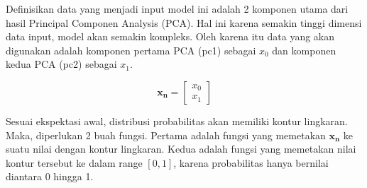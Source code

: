 Definisikan data yang menjadi input model ini adalah 2 komponen utama dari hasil Principal Componen Analysis (PCA). Hal ini karena semakin tinggi dimensi data input, model akan semakin kompleks. Oleh karena itu data yang akan digunakan adalah komponen pertama PCA (pc1) sebagai $x_0$ dan komponen kedua PCA (pc2) sebagai $x_1$.

\begin{equation}
    \mathbf{x_n}=\begin{bmatrix} x_0 \\ x_1 \end{bmatrix}
\end{equation}

Sesuai ekspektasi awal, distribusi probabilitas akan memiliki kontur lingkaran. Maka, diperlukan 2 buah fungsi. Pertama adalah fungsi yang memetakan $\mathbf{x_n}$ ke suatu nilai dengan kontur lingkaran. Kedua adalah fungsi yang memetakan nilai kontur tersebut ke dalam range $[0,1]$, karena probabilitas hanya bernilai diantara 0 hingga 1.

